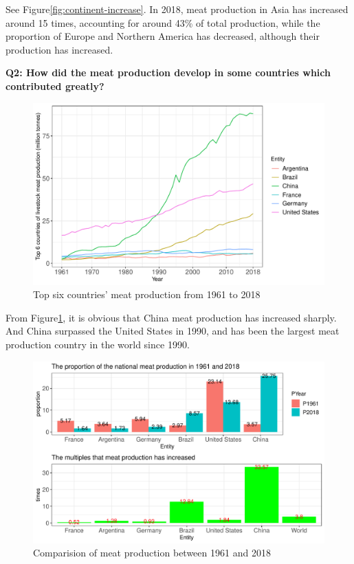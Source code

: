 \documentclass[11pt,a4paper,]{article}
\begin{document}
See Figure\ref{fig:continent-increase}. In 2018, meat production in Asia has increased around 15 times, accounting for around 43\% of total production, while the proportion of Europe and Northern America has decreased, although their production has increased.

\clearpage

\textbf{Q2: How did the meat production develop in some countries which contributed greatly?}

\begin{figure}
\centering
\includegraphics{report_files/figure-latex/country-1.pdf}
\caption{\label{fig:country}Top six countries' meat production from 1961 to 2018}
\end{figure}

From Figure\ref{fig:country}, it is obvious that China meat production has increased sharply. And China surpassed the United States in 1990, and has been the largest meat production country in the world since 1990.

\clearpage

\begin{figure}
\centering
\includegraphics{report_files/figure-latex/country-increase-1.pdf}
\caption{\label{fig:country-increase}Comparision of meat production between 1961 and 2018}
\end{figure}
\end{document}
